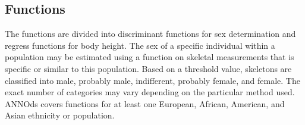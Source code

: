 \documentclass[sw]{iosart2x}
\begin{document}
\subsection{Functions}
The functions are divided into discriminant functions for sex determination and regress functions for body height.
The sex of a specific individual within a population may be estimated using a function on skeletal measurements that is specific or similar to this population.
Based on a threshold value, skeletons are classified into male, probably male, indifferent, probably female, and female.
The exact number of categories may vary depending on the particular method used.
ANNOds covers functions for at least one European, African, American, and Asian ethnicity or population.
%
%
%
%
\end{document}
